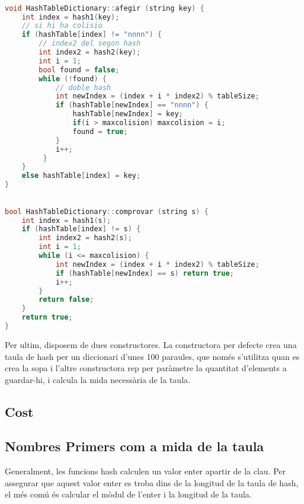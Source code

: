 \documentclass[titlepage]{article}
\begin{document}
\begin{lstlisting}[language=C++, caption= Funció per afegir un valor a la taula de hash]

void HashTableDictionary::afegir (string key) { 
    int index = hash1(key);
    // si hi ha colisio
    if (hashTable[index] != "nnnn") {
        // index2 del segon hash
        int index2 = hash2(key);
        int i = 1;
        bool found = false;
        while (!found) {
            // doble hash
            int newIndex = (index + i * index2) % tableSize;
            if (hashTable[newIndex] == "nnnn") {
                hashTable[newIndex] = key;
                if(i > maxcolision) maxcolision = i;
                found = true;
            }
            i++;
         }
    }
    else hashTable[index] = key;
}

\end{lstlisting}
\begin{lstlisting}[language=C++, caption=Funció per comprovar si un valor existeix dins la taula de hash]

bool HashTableDictionary::comprovar (string s) {
    int index = hash1(s);
    if (hashTable[index] != s) {
        int index2 = hash2(s);
        int i = 1;
        while (i <= maxcolision) {
            int newIndex = (index + i * index2) % tableSize;
            if (hashTable[newIndex] == s) return true;
            i++;
        }
        return false;
    }
    return true;
}

\end{lstlisting}

Per ultim, disposem de dues constructores. La constructora per defecte crea una taula de hash per un diccionari d’unes 100 paraules, que només s'utilitza quan es crea la sopa i l’altre constructora rep per paràmetre la quantitat d’elements a guardar-hi, i calcula la mida necessària de la taula.

\subsection{Cost}
\subsection{Nombres Primers com a mida de la taula}
Generalment, les funcions hash calculen un valor enter apartir de la clau. Per assegurar que aquest valor enter es troba dins de la longitud de la taula de hash, el més comú és calcular el mòdul de l'enter i la longitud de la taula.
\end{document}
